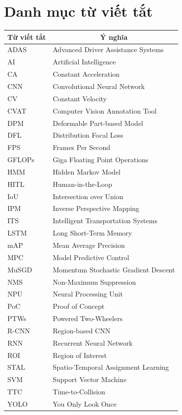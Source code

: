\newpage
\section*{Danh mục từ viết tắt}
\renewcommand{\arraystretch}{1.4} 

\begin{center}
\begin{tabular}{|p{3cm}|p{11cm}|}
\hline
\multicolumn{1}{|c|}{\textbf{Từ viết tắt}} & 
\multicolumn{1}{c|}{\textbf{Ý nghĩa}} \\
\hline
ADAS & Advanced Driver Assistance Systems \\
\hline
AI & Artificial Intelligence \\
\hline
CA & Constant Acceleration \\
\hline
CNN & Convolutional Neural Network \\
\hline
CV & Constant Velocity \\
\hline
CVAT & Computer Vision Annotation Tool \\
\hline
DPM & Deformable Part-based Model \\
\hline
DFL & Distribution Focal Loss \\
\hline
FPS & Frames Per Second \\
\hline
GFLOPs & Giga Floating Point Operations \\
\hline
HMM & Hidden Markov Model \\
\hline
HITL & Human-in-the-Loop \\
\hline
IoU & Intersection over Union \\
\hline
IPM & Inverse Perspective Mapping \\
\hline
ITS & Intelligent Transportation Systems \\
\hline
LSTM & Long Short-Term Memory \\
\hline
mAP & Mean Average Precision \\
\hline
MPC & Model Predictive Control \\
\hline
MuSGD & Momentum Stochastic Gradient Descent \\
\hline
NMS & Non-Maximum Suppression \\
\hline
NPU & Neural Processing Unit \\
\hline
PoC & Proof of Concept \\
\hline
PTWs & Powered Two-Wheelers \\
\hline
R-CNN & Region-based CNN \\
\hline
RNN & Recurrent Neural Network \\
\hline
ROI & Region of Interest \\
\hline
STAL & Spatio-Temporal Assignment Learning \\
\hline
SVM & Support Vector Machine \\
\hline
TTC & Time-to-Collision \\
\hline
YOLO & You Only Look Once \\
\hline
\end{tabular}
\end{center}